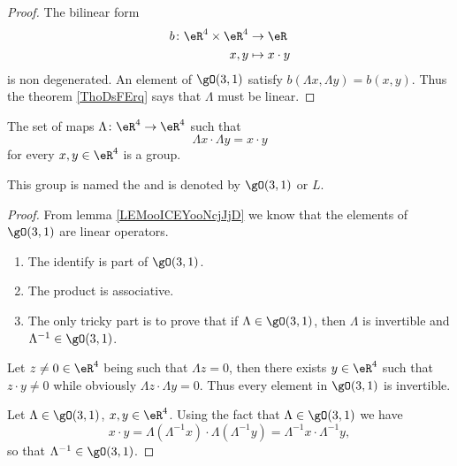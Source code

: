 \begin{proof}
    The bilinear form
    \begin{equation}
        \begin{aligned}
            b\colon \eR^4\times \eR^4&\to \eR \\
            x,y&\mapsto x\cdot y 
        \end{aligned}
    \end{equation}
    is non degenerated. An element of \( \gO(3,1)\) satisfy \( b(\Lambda x,\Lambda y)=b(x,y)\). Thus the theorem \ref{ThoDsFErq} says that \( \Lambda\) must be linear.
\end{proof}

\begin{lemmaDef}
    The set of maps \( \Lambda\colon \eR^4\to \eR^4\) such that
    \begin{equation}        \label{EQooLPXWooNgrAXz}
        \Lambda x\cdot \Lambda y=x\cdot y
    \end{equation}
    for every \( x,y\in  \eR^4\) is a group.

    This group is named the  and is denoted by \( \gO(3,1)\) or \( L\).
\end{lemmaDef}

\begin{proof}
    From lemma \ref{LEMooICEYooNcjJjD} we know that the elements of \( \gO(3,1)\) are linear operators.
    \begin{enumerate}
        \item
            The identify is part of \( \gO(3,1)\).
        \item
            The product is associative.
        \item
            The only tricky part is to prove that if \( \Lambda\in \gO(3,1)\), then \( \Lambda\) is invertible and \( \Lambda^{-1}\in \gO(3,1)\).
    \end{enumerate}
    Let \( z\neq 0\in \eR^4\) being such that \( \Lambda z=0\), then there exists \( y\in \eR^4\) such that \( z\cdot y\neq 0\) while obviously \( \Lambda z\cdot \Lambda y=0\). Thus every element in \(  \gO(3,1)\) is invertible.

    Let \( \Lambda\in \gO(3,1)\), \( x,y\in \eR^4\). Using the fact that \( \Lambda\in \gO(3,1)\) we have
    \begin{equation}
        x\cdot y= \Lambda(\Lambda^{-1} x)\cdot\Lambda(\Lambda^{-1}y)=\Lambda^{-1}x\cdot \Lambda^{-1}y,
    \end{equation}
    so that \( \Lambda^{-1}\in \gO(3,1)\).
\end{proof}

